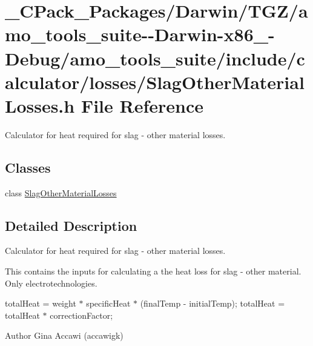 \hypertarget{___c_pack___packages_2_darwin_2_t_g_z_2amo__tools__suite--_darwin-x86__64-_debug_2amo__tools__su313ab38f55b63c215652b25ad8660f38}{}\section{\+\_\+\+C\+Pack\+\_\+\+Packages/\+Darwin/\+T\+G\+Z/amo\+\_\+tools\+\_\+suite-\/-\/\+Darwin-\/x86\+\_-\/\+Debug/amo\+\_\+tools\+\_\+suite/include/calculator/losses/\+Slag\+Other\+Material\+Losses.h File Reference}
\label{___c_pack___packages_2_darwin_2_t_g_z_2amo__tools__suite--_darwin-x86__64-_debug_2amo__tools__su313ab38f55b63c215652b25ad8660f38}


Calculator for heat required for slag -\/ other material losses.  


\subsection*{Classes}
\begin{DoxyCompactItemize}
\item 
class \hyperlink{class_slag_other_material_losses}{Slag\+Other\+Material\+Losses}
\end{DoxyCompactItemize}


\subsection{Detailed Description}
Calculator for heat required for slag -\/ other material losses. 

This contains the inputs for calculating a the heat loss for slag -\/ other material. Only electrotechnologies.

total\+Heat = weight $\ast$ specific\+Heat $\ast$ (final\+Temp -\/ initial\+Temp); total\+Heat = total\+Heat $\ast$ correction\+Factor;

\begin{DoxyAuthor}{Author}
Gina Accawi (accawigk) 
\end{DoxyAuthor}
